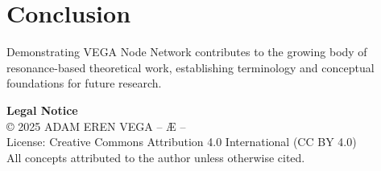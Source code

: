 \documentclass[12pt,a4paper]{article}
\begin{document}
\section{Conclusion}
Demonstrating VEGA Node Network contributes to the growing body of resonance-based theoretical work, 
establishing terminology and conceptual foundations for future research.

\vspace{1cm}
\noindent\textbf{Legal Notice}\\
© 2025 ADAM EREN VEGA – Æ –\\
License: Creative Commons Attribution 4.0 International (CC BY 4.0)\\
All concepts attributed to the author unless otherwise cited.
\end{document}
